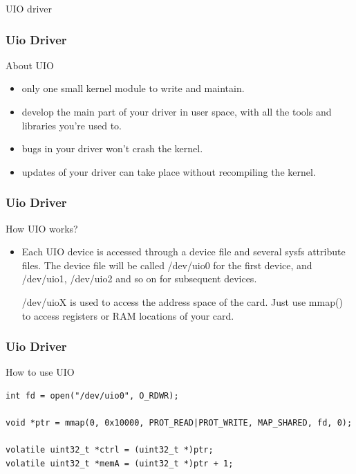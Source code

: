 \documentclass{beamer}
\begin{document}
\begin{frame}
\centering UIO driver
\end{frame}


\begin{frame}
\frametitle{Uio Driver}
\centering About UIO
\centering \\
\begin{itemize}
\item only one small kernel module to write and maintain.
\item develop the main part of your driver in user space, with all the tools and libraries you’re used to.
\item bugs in your driver won’t crash the kernel.
\item updates of your driver can take place without recompiling the kernel.
\end{itemize}
\end{frame}

\begin{frame}
\frametitle{Uio Driver}
\centering How UIO works?\\

\begin{itemize}
\item Each UIO device is accessed through a device file and several sysfs attribute files. 
      The device file will be called /dev/uio0 for the first device, and /dev/uio1, /dev/uio2 and so on for subsequent devices.

/dev/uioX is used to access the address space of the card. Just use mmap() to access registers or RAM locations of your card.


\end{itemize}
\end{frame}




\begin{frame}[fragile]
\frametitle{Uio Driver}
\centering How to use UIO\\
\begin{verbatim}
int fd = open("/dev/uio0", O_RDWR);

void *ptr = mmap(0, 0x10000, PROT_READ|PROT_WRITE, MAP_SHARED, fd, 0);

volatile uint32_t *ctrl = (uint32_t *)ptr;
volatile uint32_t *memA = (uint32_t *)ptr + 1;
\end{verbatim}
\end{frame}
\end{document}
